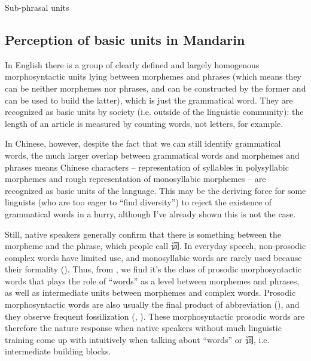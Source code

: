 \documentclass[UTF8, a4paper, oneside, scheme=plain]{ctexrep}
\begin{document}
\begin{sidewaystable}
    \centering
    \caption{Sub-phrasal units}
    \label{tbl:sub-phrasal-units}
    
\end{sidewaystable}

\subsection{Perception of basic units in Mandarin}\label{sec:pos.word.perception}

In English there is a group of clearly defined and largely homogenous morphosyntactic units 
lying between morphemes and phrases
(which means they can be neither morphemes nor phrases,
and can be constructed by the former and can be used to build the latter),
which is just the grammatical word.
They are recognized as basic units by society 
(i.e. outside of the linguistic community):
the length of an article is measured by counting words, not letters, for example.

In Chinese, however, despite the fact that 
we can still identify grammatical words,
the much larger overlap between grammatical words and morphemes and phrases
means Chinese characters -- representation of syllables in polysyllabic morphemes 
and rough representation of monosyllabic morphemes -- 
are recognized as basic units of the language.
This may be the deriving force for some linguists 
(who are too eager to ``find diversity'')
to reject the existence of grammatical words in a hurry,
although I've already shown this is not the case.

Still, native speakers generally 
confirm that there is something between the morpheme and the phrase, 
which people call 词.
In everyday speech, 
non-prosodic complex words have limited use, 
and monosyllabic words are rarely used 
because their formality ().  
Thus, from , 
we find it's the class of prosodic morphosyntactic words 
that plays the role of ``words''
as a level between morphemes and phrases,
as well as intermediate units between morphemes and complex words.
Prosodic morphosyntactic words 
are also usually the final product 
of abbreviation (),
and they observe frequent fossilization
(,
).
These morphosyntactic prosodic words are therefore the nature response 
when native speakers without much linguistic training 
come up with intuitively when talking about ``words'' or 词,
i.e. intermediate building blocks.
\end{document}
